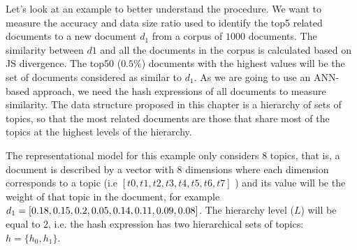 Let's look at an example to better understand the procedure. We want to measure the accuracy and data size ratio used to identify the top5 related documents to a new document $d_1$ from a corpus of $1000$ documents. The similarity between $d1$ and all the documents in the corpus is calculated based on JS divergence. The top50 ($0.5\%$) documents with the highest values will be the set of documents considered as similar to $d_1$. As we are going to use an ANN-based approach, we need the hash expressions of all documents to measure similarity. The data structure proposed in this chapter is a hierarchy of sets of topics, so that the most related documents are those that share most of the topics at the highest levels of the hierarchy.

The representational model for this example only considers 8 topics, that is, a document is described by a vector with $8$ dimensions where each dimension corresponds to a topic (i.e $[t0, t1, t2, t3, t4, t5, t6, t7]$ ) and its value will be the weight of that topic in the document, for example $d_1=[0.18, 0.15, 0.2, 0.05, 0.14, 0.11, 0.09,\\ 0.08]$. The hierarchy level ($L$) will be equal to $2$, i.e. the hash expression has two hierarchical sets of topics: $h=\{h_0, h_1\}$. 

